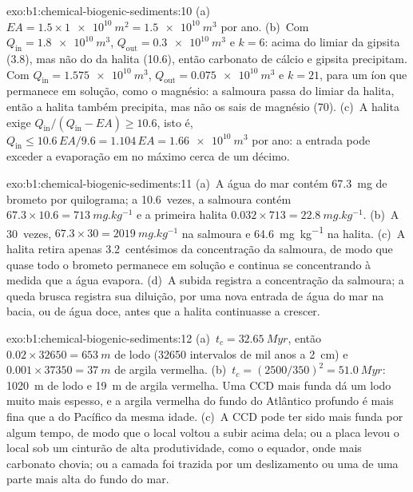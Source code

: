\begin{solution}{exo:b1:chemical-biogenic-sediments:10}
(a)~$EA = 1.5\times\qty{1e10}{m^2} = \qty{1.5e10}{m^3}$ por ano. (b)~Com
$Q_{\mathrm{in}} = \qty{1.8e10}{m^3}$, $Q_{\mathrm{out}} = \qty{0.3e10}{m^3}$ e
$k = 6$: acima do limiar da gipsita (3.8), mas não do da halita (10.6), então
carbonato de cálcio e gipsita precipitam. Com $Q_{\mathrm{in}} =
\qty{1.575e10}{m^3}$, $Q_{\mathrm{out}} = \qty{0.075e10}{m^3}$ e $k = 21$, para
um íon que permanece em solução, como o magnésio: a salmoura passa do limiar da halita,
então a halita também precipita, mas não os sais de magnésio (70). (c)~A halita
exige $Q_{\mathrm{in}}/(Q_{\mathrm{in}} - EA) \ge 10.6$, isto é,
$Q_{\mathrm{in}} \le 10.6\,EA/9.6 = 1.104\,EA = \qty{1.66e10}{m^3}$ por ano: a
entrada pode exceder a evaporação em no máximo cerca de um décimo.
\end{solution}

\begin{solution}{exo:b1:chemical-biogenic-sediments:11}
(a)~A água do mar contém \qty{67.3}{mg} de brometo por quilograma; a 10.6~vezes, a
salmoura contém $67.3\times10.6 = \qty{713}{mg.kg^{-1}}$ e a primeira halita
$0.032\times713 = \qty{22.8}{mg.kg^{-1}}$. (b)~A 30~vezes, $67.3\times30 =
\qty{2019}{mg.kg^{-1}}$ na salmoura e \qty{64.6}{mg.kg^{-1}} na halita.
(c)~A halita retira apenas 3.2~centésimos da concentração da salmoura, de modo que
quase todo o brometo permanece em solução e continua se concentrando à medida que a
água evapora. (d)~A subida registra a concentração da salmoura; a queda brusca registra
sua diluição, por uma nova entrada de água do mar na bacia, ou de água doce, antes que
a halita continuasse a crescer.
\end{solution}

\begin{solution}{exo:b1:chemical-biogenic-sediments:12}
(a)~$t_c = \qty{32.65}{Myr}$, então $0.02\times\num{32650} = \qty{653}{m}$ de
lodo (\num{32650} intervalos de mil anos a \qty{2}{cm}) e
$0.001\times\num{37350} = \qty{37}{m}$ de argila vermelha. (b)~$t_c = (2500/350)^2 =
\qty{51.0}{Myr}$: \qty{1020}{m} de lodo e \qty{19}{m} de argila vermelha. Uma CCD
mais funda dá um lodo muito mais espesso, e a argila vermelha do fundo do Atlântico
profundo é mais fina que a do Pacífico da mesma idade. (c)~A CCD pode ter sido mais funda
por algum tempo, de modo que o local voltou a subir acima dela; ou a placa levou o local
sob um cinturão de alta produtividade, como o equador, onde mais carbonato chovia; ou a
camada foi trazida por um deslizamento ou uma  de uma parte mais alta
do fundo do mar.
\end{solution}

